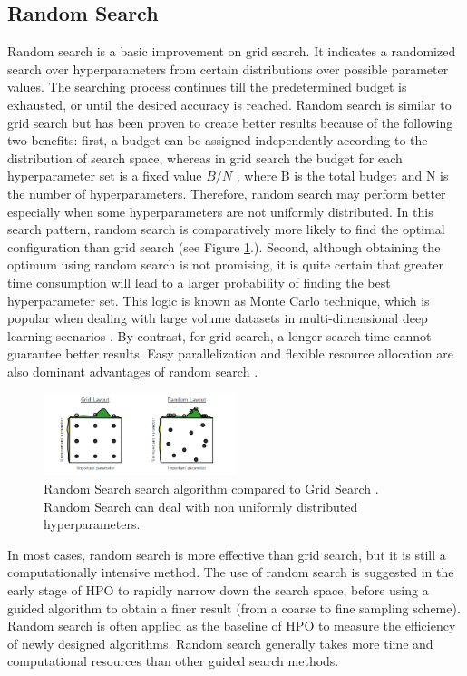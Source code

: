 \documentclass[conference]{IEEEtran}
\begin{document}
\subsection{Random Search}
Random search \cite{10.5555/2188385.2188395} is a basic improvement on grid search. It indicates a randomized search over hyperparameters from certain distributions over possible parameter values. The searching process continues till the predetermined budget is exhausted, or until the desired accuracy is reached. Random search is similar to grid search but has been proven to create better results because of the following two benefits: first, a budget can be assigned independently according to the distribution of search space, whereas in grid search the budget for each hyperparameter set is a fixed value $B/N$ , where B is the total budget and N is the number of hyperparameters. Therefore, random search may perform better especially when some hyperparameters are not uniformly distributed. In this search pattern, random search is comparatively more likely to find the optimal configuration than grid search (see Figure \ref{grid_vs_random}.). Second, although obtaining the optimum using random search is not promising, it is quite certain that greater time consumption will lead to a larger probability of finding the best hyperparameter set. This logic is known as Monte Carlo technique, which is popular when dealing with large volume datasets in multi-dimensional deep learning scenarios \cite{10.1063/1.3295638}. By contrast, for grid search, a longer search time cannot guarantee better results. Easy parallelization and flexible resource allocation are also dominant advantages of random search \cite{10.5555/1981094.1981164}. \cite{yu2020hyperparameter}
\begin{figure}[htbp]
\centerline{\includegraphics[width=0.5\textwidth]{grid_vs_random.png}}
\caption{Random Search search algorithm compared to Grid Search \cite{yu2020hyperparameter}. Random Search can deal with non uniformly distributed hyperparameters.}
\label{grid_vs_random}
\end{figure}

In most cases, random search is more effective than grid search, but it is still a computationally intensive method. The use of random search is suggested in the early stage of HPO to rapidly narrow down the search space, before using a guided algorithm to obtain a finer result (from a coarse to fine sampling scheme). Random search is often applied as the baseline of HPO to measure the efficiency of newly designed algorithms. Random search generally takes more time and computational resources than other guided search methods. \cite{yu2020hyperparameter}
\end{document}
